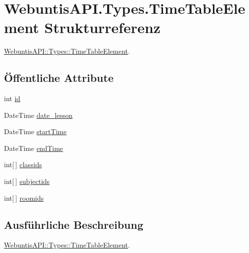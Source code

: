 \hypertarget{struct_webuntis_a_p_i_1_1_types_1_1_time_table_element}{\section{Webuntis\-A\-P\-I.\-Types.\-Time\-Table\-Element Strukturreferenz}
\label{struct_webuntis_a_p_i_1_1_types_1_1_time_table_element}
}


\hyperlink{struct_webuntis_a_p_i_1_1_types_1_1_time_table_element}{Webuntis\-A\-P\-I\-::\-Types\-::\-Time\-Table\-Element}.  


\subsection*{Öffentliche Attribute}
\begin{DoxyCompactItemize}
\item 
int \hyperlink{struct_webuntis_a_p_i_1_1_types_1_1_time_table_element_a3d6f4d06843dbad8ddbdbd21e2aea0b6}{id}
\item 
Date\-Time \hyperlink{struct_webuntis_a_p_i_1_1_types_1_1_time_table_element_a2ce093cea22aa8960523959541d15d02}{date\-\_\-lesson}
\item 
Date\-Time \hyperlink{struct_webuntis_a_p_i_1_1_types_1_1_time_table_element_a9a7059aea921d721fea81b09882c8b2f}{start\-Time}
\item 
Date\-Time \hyperlink{struct_webuntis_a_p_i_1_1_types_1_1_time_table_element_a0ef904dd3308b39f0ef4af265e428544}{end\-Time}
\item 
int\mbox{[}$\,$\mbox{]} \hyperlink{struct_webuntis_a_p_i_1_1_types_1_1_time_table_element_ab3f7530ba709811a0f080b9f25ee3b76}{classids}
\item 
int\mbox{[}$\,$\mbox{]} \hyperlink{struct_webuntis_a_p_i_1_1_types_1_1_time_table_element_a3603be7f40d3358ce0f1a9a0b583cae6}{subjectids}
\item 
int\mbox{[}$\,$\mbox{]} \hyperlink{struct_webuntis_a_p_i_1_1_types_1_1_time_table_element_add1b2a25e2b6c0c7cb02ef57c6b2ea6b}{roomids}
\end{DoxyCompactItemize}


\subsection{Ausführliche Beschreibung}
\hyperlink{struct_webuntis_a_p_i_1_1_types_1_1_time_table_element}{Webuntis\-A\-P\-I\-::\-Types\-::\-Time\-Table\-Element}. 

